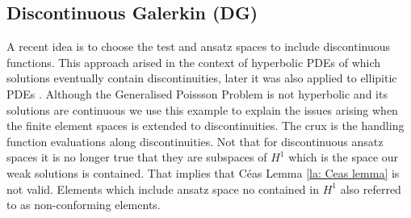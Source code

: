 \begin{definition} 
\section{Discontinuous Galerkin (DG)} \label{sec: SIPG}
A recent idea is to choose the test and ansatz spaces to include discontinuous functions. This approach arised in the context of hyperbolic PDEs of which solutions eventually contain discontinuities, later it was also applied to ellipitic PDEs \cite{ABC+2002}. Although the Generalised Poissson Problem is not hyperbolic and its solutions are continuous we use this example to explain the issues arising when the finite element spaces is extended to discontinuities. The crux is the handling function evaluations along discontinuities. Not that for discontinuous ansatz spaces it is no longer true that they are subspaces of $H^1$ which is the space our weak solutions is contained. That implies that C\'eas Lemma \ref{la: Ceas lemma} is not valid. Elements which include ansatz space no contained in $H^1$ also referred to as non-conforming elements.


\end{definition}
